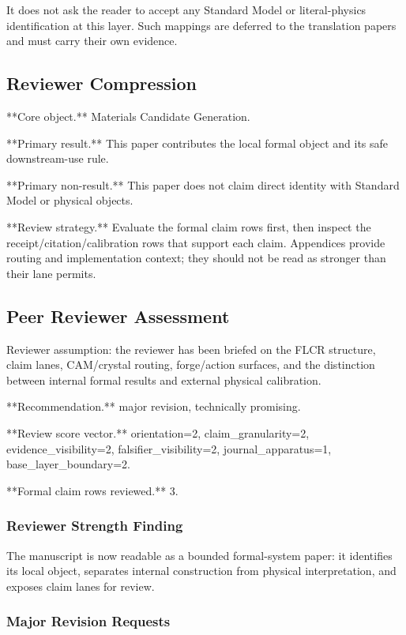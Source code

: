 \documentclass[11pt]{article}
\begin{document}
It does not ask the reader to accept any Standard Model or literal-physics identification at this layer. Such mappings are deferred to the translation papers and must carry their own evidence.

\subsection*{Reviewer Compression}

**Core object.** Materials Candidate Generation.

**Primary result.** This paper contributes the local formal object and its safe downstream-use rule.

**Primary non-result.** This paper does not claim direct identity with Standard Model or physical objects.

**Review strategy.** Evaluate the formal claim rows first, then inspect the receipt/citation/calibration rows that support each claim. Appendices provide routing and implementation context; they should not be read as stronger than their lane permits.

\subsection*{Peer Reviewer Assessment}

Reviewer assumption: the reviewer has been briefed on the FLCR structure, claim lanes, CAM/crystal routing, forge/action surfaces, and the distinction between internal formal results and external physical calibration.

**Recommendation.** major revision, technically promising.

**Review score vector.** orientation=2, claim\_granularity=2, evidence\_visibility=2, falsifier\_visibility=2, journal\_apparatus=1, base\_layer\_boundary=2.

**Formal claim rows reviewed.** 3.

\subsubsection*{Reviewer Strength Finding}

The manuscript is now readable as a bounded formal-system paper: it identifies its local object, separates internal construction from physical interpretation, and exposes claim lanes for review.

\subsubsection*{Major Revision Requests}
\end{document}
